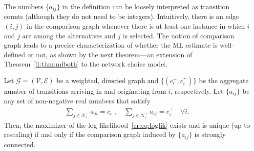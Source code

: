 The numbers $\{ a_{ij}\}$ in the definition can be loosely interpreted as transition counts (although they do not need to be integers).
Intuitively, there is an edge $(i, j)$ in the comparison graph whenever there is at least one instance in which $i$ and $j$ are among the alternatives and $j$ is selected.
The notion of comparison graph leads to a precise characterization of whether the ML estimate is well-defined or not, as shown by the next theorem---an extension of Theorem~\ref{fi:thm:mlboth} to the network choice model.

\begin{theorem}
\label{cr:thm:mlboth}
Let $\mathcal{G} = (\mathcal{V}, \mathcal{E})$ be a weighted, directed graph and $\{ (c^-_i, c^+_i) \}$ be the aggregate number of transitions arriving in and originating from $i$, respectively.
Let $\{ a_{ij} \}$ be any set of non-negative real numbers that satisfy
\begin{align*}
\sum_{j \in \mathcal{N}^-_i} a_{ji} = c^-_i, \quad
\sum_{j \in \mathcal{N}^+_i} a_{ij} = c^+_i \quad \forall i.
\end{align*}
Then, the maximizer of the log-likelihood~\eqref{cr:eq:loglik} exists and is unique (up to rescaling) if and only if the comparison graph induced by $\{ a_{ij} \}$ is strongly connected.
\end{theorem}

